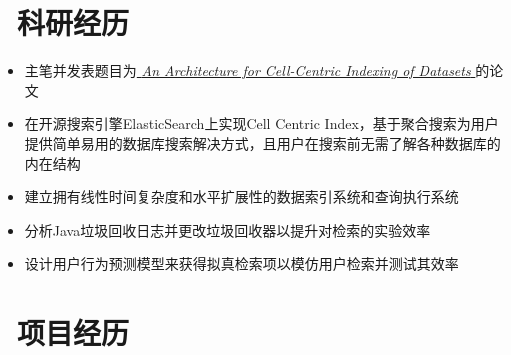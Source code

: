 \documentclass{resume}
\begin{document}
\vspace{-6pt}

\section{\faFlask\ 科研经历}
\begin{itemize}
  \item 主笔并发表题目为\href{http://ceur-ws.org/Vol-2722/profiles2020-paper-2.pdf}{ \textit{An Architecture for Cell-Centric Indexing of Datasets }}的论文
  \item 在开源搜索引擎ElasticSearch上实现Cell Centric Index，基于聚合搜索为用户提供简单易用的数据库搜索解决方式，且用户在搜索前无需了解各种数据库的内在结构
  \item 建立拥有线性时间复杂度和水平扩展性的数据索引系统和查询执行系统
  \item 分析Java垃圾回收日志并更改垃圾回收器以提升对检索的实验效率
  \item 设计用户行为预测模型来获得拟真检索项以模仿用户检索并测试其效率
\end{itemize}
\vspace{-10pt}

\section{\faLaptop\ 项目经历}
\end{document}
